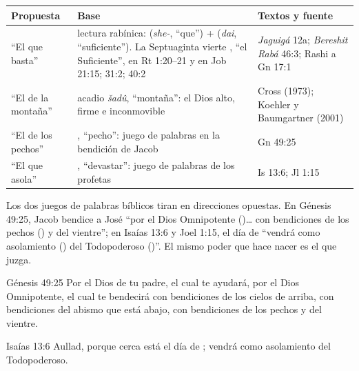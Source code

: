 \begin{center}\small\renewcommand{\arraystretch}{1.25}
\begin{tabular}{@{}L{3.0cm}L{6.4cm}L{5.0cm}@{}}
\toprule
\textbf{Propuesta} & \textbf{Base} & \textbf{Textos y fuente} \\ \midrule
``El que basta'' & lectura rabínica:  (\emph{she-}, ``que'') +  (\emph{dai}, ``suficiente''). La Septuaginta vierte , ``el Suficiente'', en Rt 1:20--21 y en Job 21:15; 31:2; 40:2 & \emph{Jaguigá} 12a; \emph{Bereshit Rabá} 46:3; Rashi a Gn 17:1 \\
``El de la montaña'' & acadio \emph{šadû}, ``montaña'': el Dios alto, firme e inconmovible & Cross (1973); Koehler y Baumgartner (2001) \\
``El de los pechos'' & , ``pecho'': juego de palabras en la bendición de Jacob & Gn 49:25 \\
``El que asola'' & , ``devastar'': juego de palabras de los profetas & Is 13:6; Jl 1:15 \\
\bottomrule
\end{tabular}\end{center}

Los dos juegos de palabras bíblicos tiran en direcciones opuestas. En Génesis 49:25, Jacob bendice a José ``por el Dios Omnipotente ()\ldots{} con bendiciones de los pechos () y del vientre''; en Isaías 13:6 y Joel 1:15, el día de \SENOR{} ``vendrá como asolamiento () del Todopoderoso ()''. El mismo poder que hace nacer es el que juzga.

\begin{verso}{Génesis 49:25}
Por el Dios de tu padre, el cual te ayudará, por el Dios Omnipotente, el cual te bendecirá con bendiciones de los cielos de arriba, con bendiciones del abismo que está abajo, con bendiciones de los pechos y del vientre.
\end{verso}

\begin{verso}{Isaías 13:6}
Aullad, porque cerca está el día de \SENOR; vendrá como asolamiento del Todopoderoso.
\end{verso}


